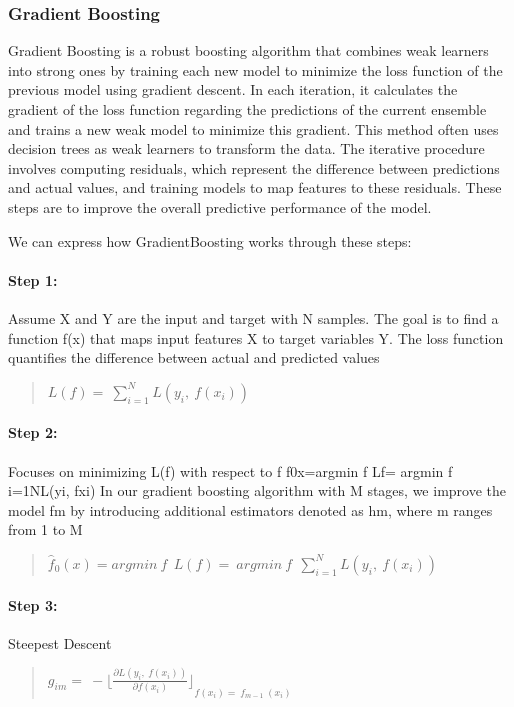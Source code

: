 \subsubsection{Gradient Boosting}
Gradient Boosting is a robust boosting algorithm that combines weak learners into strong ones by training each new model to minimize the loss function of the previous model using gradient descent. In each iteration, it calculates the gradient of the loss function regarding the predictions of the current ensemble and trains a new weak model to minimize this gradient. This method often uses decision trees as weak learners to transform the data. The iterative procedure involves computing residuals, which represent the difference between predictions and actual values, and training models to map features to these residuals. These steps are to improve the overall predictive performance of the model. 

We can express how GradientBoosting works through these steps: 

\paragraph*{Step 1:} Assume X and Y are the input and target with N samples. The goal is to find a function f(x) that maps input features X to target variables Y. The loss function quantifies the difference between actual and predicted values
\begin{quote}
    
    \(L(f) = \ \sum_{i=1}^{N}L(y_{i},\ f\left( x_{i} \right))\)
\end{quote}

\paragraph*{Step 2:} Focuses on minimizing L(f) with respect to f
f0x=argmin f  Lf= argmin f  i=1NL(yi, fxi)
In our gradient boosting algorithm with M stages, we improve the model fm by introducing additional estimators denoted as hm, where m ranges from 1 to M
\begin{quote}
    \({\widehat{f}}_{0}(x) = argmin\ f\ \ L(f) = \ argmin\ f\ \ \sum_{i=1}^{N}L(y_{i},\ f\left( x_{i} \right))\)

\end{quote}

\paragraph*{Step 3:} Steepest Descent
\begin{quote}
    \(g_{im} = \  - {\lfloor\frac{\partial L(y_{i},\ f\left( x_{i} \right))}{\partial f(x_{i})}\rfloor}_{f\left( x_{i} \right) = \ f_{m - 1}\ (x_{i})}\)

\end{quote}

